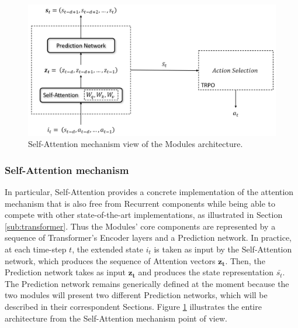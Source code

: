             \begin{figure}[!t]
                    \centering
                    \includegraphics[width=15cm, keepaspectratio]{images/module/selfattention_view.png}
                    \caption{Self-Attention mechanism view of the Modules architecture.}
                    \label{fig:module_selfattention_view}
            \end{figure}
            
            \subsubsection{Self-Attention mechanism}
                In particular, Self-Attention provides a concrete implementation of the attention mechanism that is also free from Recurrent components while being able to compete with other state-of-the-art implementations, as illustrated in Section \ref{sub:transformer}. Thus the Modules' core components are represented by a sequence of Transformer's Encoder layers and a Prediction network. In practice, at each time-step $t$, the extended state $i_t$ is taken as input by the Self-Attention network, which produces the sequence of Attention vectors $\mathbf{z_t}$. Then, the Prediction network takes as input $\mathbf{z_t}$ and produces the state representation $\bar{s_t}$. The Prediction network remains generically defined at the moment because the two modules will present two different Prediction networks, which will be described in their correspondent Sections. Figure \ref{fig:module_selfattention_view} illustrates the entire architecture from the Self-Attention mechanism point of view.
                
    
    \newpage
